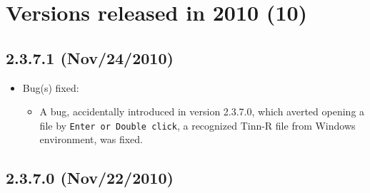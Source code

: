 
\section{Versions released in 2010 (10)}
\subsection{2.3.7.1 (Nov/24/2010)}

\begin{itemize}
  \item Bug(s) fixed:
    \begin{itemize}
      \item A bug, accidentally introduced in version 2.3.7.0, which averted opening a file by \texttt{Enter or Double click},
        a recognized Tinn-R file from Windows environment, was fixed.
    \end{itemize}
\end{itemize}

\subsection{2.3.7.0 (Nov/22/2010)}

